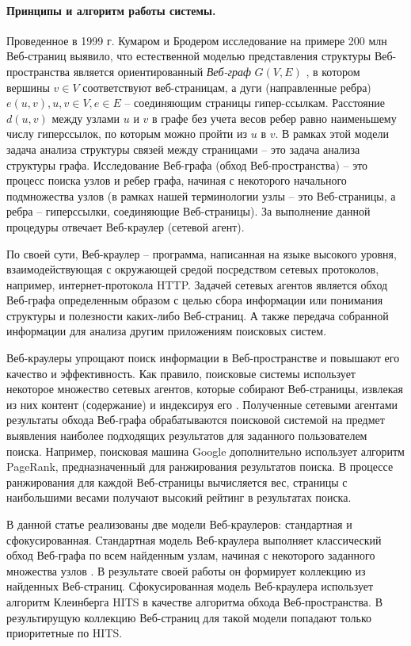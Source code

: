\paragraph{Принципы и алгоритм работы системы.} Проведенное в 1999 г. Кумаром и Бродером исследование \cite{BroderKumarMaghoul} на примере 200 млн Веб-страниц выявило, что естественной моделью представления структуры Веб-пространства является ориентированный \textit{Веб-граф} \(G(V,E)\) \cite{BroderKumarMaghoul}, в котором вершины \(v \in V\) соответствуют веб-страницам, а дуги (направленные ребра) \(e(u, v), u, v \in V, e \in E\) -- соединяющим страницы гипер-ссылкам. Расстояние \(d(u, v)\) между узлами \(u\) и \(v\) в графе без учета весов ребер равно наименьшему числу гиперссылок, по которым можно пройти из \(u\) в \(v\). В рамках этой модели задача анализа структуры связей между страницами -- это задача анализа структуры графа. Исследование Веб-графа (обход Веб-пространства) -- это процесс поиска узлов и ребер графа, начиная с некоторого начального подмножества узлов (в рамках нашей терминологии узлы -- это Веб-страницы, а ребра -- гиперссылки, соединяющие Веб-страницы). За выполнение данной процедуры отвечает Веб-краулер (сетевой агент).

По своей сути, Веб-краулер -- программа, написанная на языке высокого уровня, взаимодействующая с окружающей средой посредством сетевых протоколов, например, интернет-протокола HTTP. Задачей сетевых агентов является обход Веб-графа определенным образом с целью сбора информации или понимания структуры и полезности каких-либо Веб-страниц. А также передача собранной информации для анализа другим приложениям поисковых систем.

Веб-краулеры упрощают поиск информации в Веб-пространстве и повышают его качество и эффективность. Как правило, поисковые системы использует некоторое множество сетевых агентов, которые собирают Веб-страницы, извлекая из них контент (содержание) и индексируя его \cite{ManningRaghavanSchutze}. Полученные сетевыми агентами результаты обхода Веб-графа обрабатываются поисковой системой на предмет выявления наиболее подходящих результатов для заданного пользователем поиска. Например, поисковая машина Google дополнительно использует алгоритм PageRank, предназначенный для ранжирования результатов поиска. В процессе ранжирования для каждой Веб-страницы вычисляется вес, страницы с наибольшими весами получают высокий рейтинг в результатах поиска.

В данной статье реализованы две модели Веб-краулеров: стандартная и сфокусированная. Стандартная модель Веб-краулера выполняет классический обход Веб-графа по всем найденным узлам, начиная с некоторого заданного множества узлов \cite{ArasuChoGM}. В результате своей работы он формирует коллекцию из найденных Веб-страниц. Сфокусированная модель Веб-краулера использует алгоритм Клеинберга HITS в качестве алгоритма обхода Веб-пространства. В результирущую коллекцию Веб-страниц для такой модели попадают только приоритетные по HITS.

